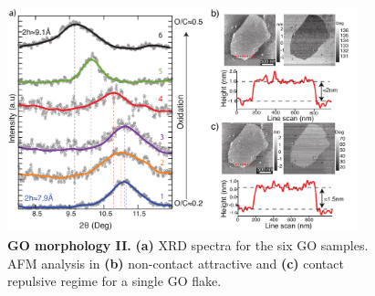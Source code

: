 \begin{figure}
  \centering
  \includegraphics[width=4in]{paper3/Fig5.pdf}
  \caption{\textbf{GO morphology II.} \textbf{(a)} XRD spectra for the six GO samples. AFM analysis in  \textbf{(b)} non-contact attractive and \textbf{(c)} contact repulsive regime for a single GO flake.}
  \label{Fig5_pap3}
\end{figure}

